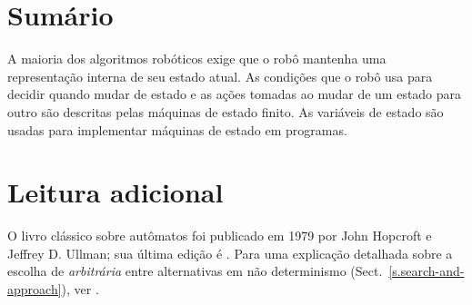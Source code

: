\section{Sumário}

A maioria dos algoritmos robóticos exige que o robô mantenha uma representação interna de seu estado atual. As condições que o robô usa para decidir quando mudar de estado e as ações tomadas ao mudar de um estado para outro são descritas pelas máquinas de estado finito. As variáveis de estado são usadas para implementar máquinas de estado em programas.

\section{Leitura adicional}

O livro clássico sobre autômatos foi publicado em 1979 por John Hopcroft e Jeffrey D. Ullman; sua última edição é \cite{automata}. Para uma explicação detalhada sobre a escolha de \emph{arbitrária} entre alternativas em não determinismo (Sect.~\ref{s.search-and-approach}), ver \cite[sect.~2.4]{pcdp2}.
